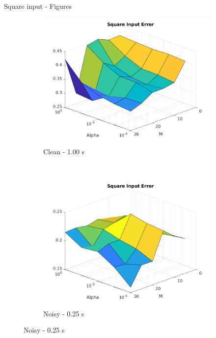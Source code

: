 \documentclass{beamer}
\begin{document}
\begin{frame}{Square input - Figures}
\begin{figure}
        \hfill
        \begin{subfigure}[b]{0.3\textwidth}
            \centering
            \includegraphics[width=\textwidth]{Figures_Clean/figure_square_T_1.00.png}
            \caption{Clean - 1.00 s}
            \label{fig:clean_square_100}
        \end{subfigure}
        \\
        \begin{subfigure}[b]{0.3\textwidth}
            \centering
            \includegraphics[width=\textwidth]{Figures_Noisy/figure_square_T_0.25.png}
            \caption{Noisy - 0.25 s}
            \label{fig:noisy_square_025}
        \end{subfigure}
        \hfill

\end{figure}
\end{frame}
\end{document}
